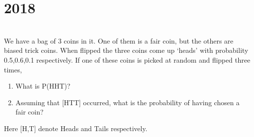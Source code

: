 \section*{2018}
\vspace{-.5cm}
\hrulefill \smallskip\\
 We have a bag of 3 coins in it. One of them is a fair coin, but the others are biased trick coins. When flipped the three coins come up `heads' with probability 0.5,0.6,0.1 respectively. If one of these coins is picked at random and flipped three times,
\begin{enumerate}[topsep=0pt, itemsep = -1ex,label=(\roman*)]
    \item What is P(HHT)?
    \item Assuming that [HTT] occurred, what is the probability of having chosen a fair coin?
\end{enumerate} Here [H,T] denote Heads and Tails respectively.